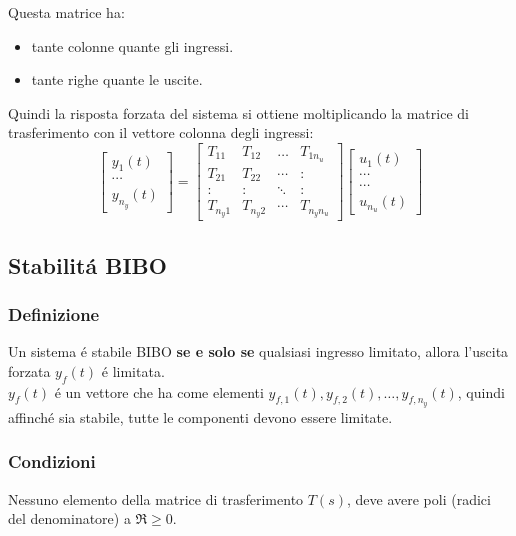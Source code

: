\documentclass[../main.tex]{subfiles}
\begin{document}
	Questa matrice ha:
	\begin{itemize}
		\item tante colonne quante gli ingressi.
		\item tante righe quante le uscite.
	\end{itemize}
	Quindi la risposta forzata del sistema si ottiene moltiplicando la matrice di trasferimento con il vettore colonna degli ingressi:
	\[ \left[ \begin{array}{c}y_1(t)\\\cdots\\y_{n_y}(t)\end{array} \right] = \left[ \begin{array}{cccc}
	T_{11} & T_{12} & \dots & T_{1n_u} \\ 
	T_{21} & T_{22} & \cdots & \colon \\ 
	\colon & \colon & \ddots & \colon \\ 
	T_{n_y1}& T_{n_y2} & \cdots & T_{n_yn_u} 
	\end{array} \right] \left[ \begin{array}{c}u_1(t)\\\cdots\\\cdots\\u_{n_u}(t)\end{array} \right] \]
	\subsection{Stabilit\'a BIBO}
	\subsubsection*{Definizione}
	Un sistema \'e stabile BIBO \textbf{se e solo se} qualsiasi ingresso limitato, allora l'uscita forzata $ y_f(t) $ \'e limitata.\\
	$ y_f(t) $ \'e un vettore che ha come elementi $ y_{f,1}(t), y_{f,2}(t), \dots, y_{f,n_y}(t) $, quindi affinch\'e sia stabile, tutte le componenti devono essere limitate.
	\subsubsection*{Condizioni}
	Nessuno elemento della matrice di trasferimento $ T(s) $, deve avere poli (radici del denominatore) a $ \Re \geq 0 $.
\end{document}
